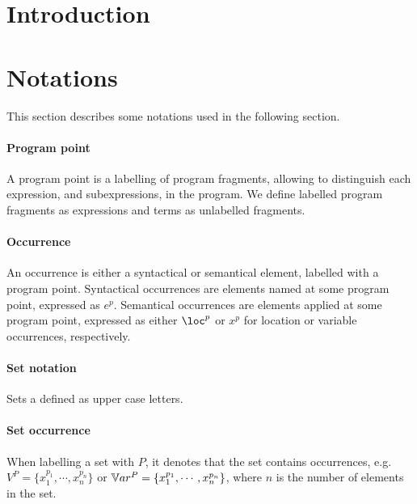 \documentclass[../../master.tex]{subfiles}
\begin{document}
\section{Introduction}

\section{Notations}
This section describes some notations used in the following section.

\paragraph{Program point}
A program point is a labelling of program fragments, allowing to distinguish each expression, and subexpressions, in the program.
We define labelled program fragments as expressions and terms as unlabelled fragments.

\paragraph{Occurrence}
An occurrence is either a syntactical or semantical element, labelled with a program point.
Syntactical occurrences are elements named at some program point, expressed as $e^p$.
Semantical occurrences are elements applied at some program point, expressed as either $\loc^p$ or $x^p$ for location or variable occurrences, respectively.

\paragraph{Set notation}
Sets a defined as upper case letters.

\paragraph{Set occurrence}
When labelling a set with $P$, it denotes that the set contains occurrences, e.g. $V^P=\{x_1^{p_1},\cdots,x_n^{p_n}\}$ or $\mathbb{V}ar^P=\{x_1^{p_1},\cdots,x_n^{p_n}\}$, where $n$ is the number of elements in the set.
\end{document}
